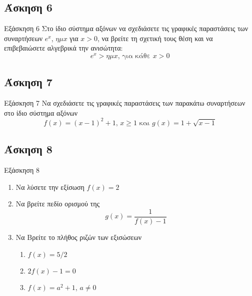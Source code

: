 \documentclass[greek]{beamer}
\begin{document}
\subsection{Άσκηση 6}
\begin{frame}[label=Άσκηση6,t]{Εξάσκηση 6}
      Στο ίδιο σύστημα αξόνων να σχεδιάσετε τις γραφικές παραστάσεις των συναρτήσεων $e^x$, $ημ x$ για $x>0$, να βρείτε τη σχετική τους θέση και να επιβεβαιώσετε αλγεβρικά την ανισώτητα:
      $$e^x>ημ x \text{, για κάθε } x>0$$
\end{frame}

\subsection{Άσκηση 7}
\begin{frame}[label=Άσκηση7,t]{Εξάσκηση 7}
      Να σχεδιάσετε τις γραφικές παραστάσεις των παρακάτω συναρτήσεων στο ίδιο σύστημα αξόνων
      $$f(x)=(x-1)^2+1\text{, } x\ge 1 \text{ και } g(x)=1+\sqrt{x-1}$$
\end{frame}

\subsection{Άσκηση 8}
\begin{frame}[label=Άσκηση8,t]{Εξάσκηση 8}
      \href{https://www.geogebra.org/m/euy2uhma}{}
      \begin{enumerate}
            \item<1-> Να λύσετε την εξίσωση $f(x)=2$
            \item<2-> Να βρείτε πεδίο ορισμού της $$g(x)=\frac{1}{f(x)-1}$$
            \item<3-> Να Βρείτε το πλήθος ριζών των εξισώσεων
                  \begin{enumerate}
                        \item<4-> $f(x)=5/2$
                        \item<5-> $2f(x)-1=0$
                        \item<6-> $f(x)=a^2+1$, $a\ne 0$
                  \end{enumerate}
      \end{enumerate}
\end{frame}
\end{document}
